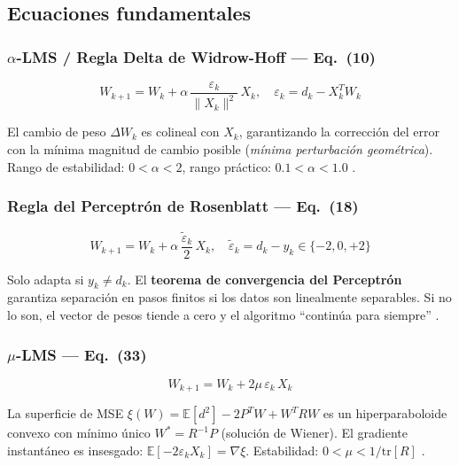 \documentclass[11pt,a4paper]{article}
\newcommand{\E}{\mathbb{E}}
\newcommand{\norm}[1]{\lVert#1\rVert}
\begin{document}
\subsection{Ecuaciones fundamentales}

\subsubsection{$\alpha$-LMS / Regla Delta de Widrow-Hoff — Eq.~(10)}

\begin{equation}
W_{k+1} = W_k + \alpha\,\frac{\varepsilon_k}{\norm{X_k}^2}\,X_k,\quad \varepsilon_k = d_k - X_k^T W_k
\label{eq:alpha_lms}
\end{equation}

El cambio de peso $\Delta W_k$ es colineal con $X_k$, garantizando la corrección del error con
la mínima magnitud de cambio posible (\textit{mínima perturbación geométrica}). Rango de
estabilidad: $0 < \alpha < 2$, rango práctico: $0.1 < \alpha < 1.0$ \cite{widrow1990}.

\subsubsection{Regla del Perceptrón de Rosenblatt — Eq.~(18)}

\begin{equation}
W_{k+1} = W_k + \alpha\,\frac{\tilde{\varepsilon}_k}{2}\,X_k,\quad \tilde{\varepsilon}_k = d_k - y_k \in \{-2,0,+2\}
\label{eq:perceptron}
\end{equation}

Solo adapta si $y_k \neq d_k$. El \textbf{teorema de convergencia del Perceptrón} garantiza
separación en pasos finitos si los datos son linealmente separables. Si no lo son, el vector
de pesos tiende a cero y el algoritmo ``continúa para siempre'' \cite{widrow1990,rosenblatt1958}.

\subsubsection{$\mu$-LMS — Eq.~(33)}

\begin{equation}
W_{k+1} = W_k + 2\mu\,\varepsilon_k\,X_k
\label{eq:mu_lms}
\end{equation}

La superficie de MSE $\xi(W) = \E[d^2] - 2P^T W + W^T R W$ es un hiperparaboloide convexo
con mínimo único $W^* = R^{-1}P$ (solución de Wiener). El gradiente instantáneo es insesgado:
$\E[-2\varepsilon_k X_k] = \nabla\xi$. Estabilidad: $0 < \mu < 1/\mathrm{tr}[R]$ \cite{widrow1990}.
\end{document}
